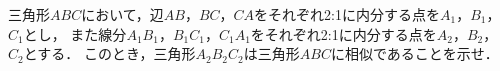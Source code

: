 \documentclass[../../main.tex]{subfiles}
\begin{document}
三角形$ABC$において，辺$AB$，$BC$，$CA$をそれぞれ2:1に内分する点を$A_1$，$B_1$，$C_1$とし，
また線分$A_1B_1$，$B_1C_1$，$C_1A_1$をそれぞれ2:1に内分する点を$A_2$，$B_2$，$C_2$とする．
このとき，三角形$A_2B_2C_2$は三角形$ABC$に相似であることを示せ．
\end{document}
